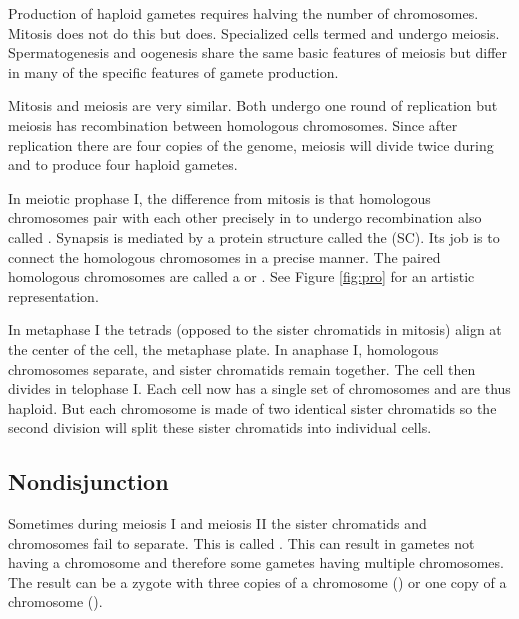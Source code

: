 \documentclass[../Bio_chemistryReview.tex]{subfiles}
\begin{document}
Production of haploid gametes requires halving the number of chromosomes.
Mitosis does not do this but  does. Specialized cells termed
 and  undergo meiosis. Spermatogenesis
and oogenesis share the same basic features of meiosis but differ in many of the
specific features of gamete production.\par

Mitosis and meiosis are very similar. Both undergo one round of replication but
meiosis has recombination between homologous chromosomes. Since after
replication there are four copies of the genome, meiosis will divide twice
during  and  to produce
four haploid gametes. 

In meiotic prophase I, the difference from mitosis is that homologous
chromosomes pair with each other precisely in  to undergo
recombination also called . Synapsis is mediated by a
protein structure called the  (SC). Its job is to
connect the homologous chromosomes in a precise manner. The paired homologous
chromosomes are called a  or . See Figure
\ref{fig:pro} for an artistic representation.\par

In metaphase I the tetrads (opposed to the sister chromatids in mitosis) align
at the center of the cell, the metaphase plate. In anaphase I, homologous
chromosomes separate, and sister chromatids remain together. The cell then
divides in telophase I. Each cell now has a single set of chromosomes and are
thus haploid. But each chromosome is made of two identical sister chromatids so
the second division will split these sister chromatids into individual cells.

\subsection{Nondisjunction}
Sometimes during meiosis I and meiosis II the sister chromatids and chromosomes
fail to separate. This is called . This can result in
gametes not having a chromosome and therefore some gametes having multiple
chromosomes. The result can be a zygote with three copies of a chromosome
() or one copy of a chromosome ().
\end{document}
